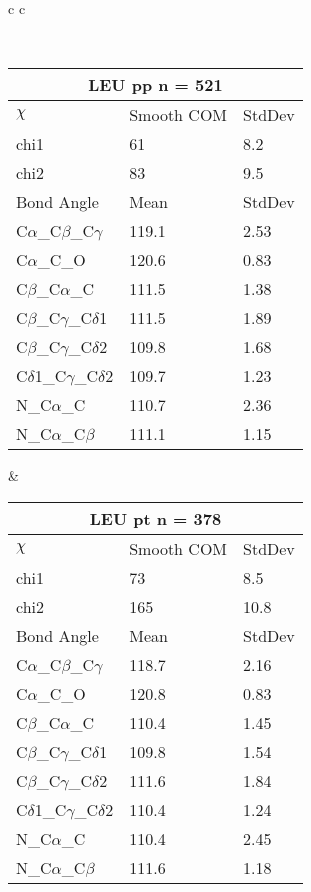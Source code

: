 \newpage

\begin{longtable}{ c c }

\caption{LEU Central Values}\\
  \begin{tabular}{ l l l }
  \toprule
  \multicolumn{3}{c}{LEU \textbf{pp} n = 521} \\ \toprule
  $\chi$       & Smooth COM & StdDev \\ \midrule
  chi1 & 61 & 8.2 \\ 
  chi2 & 83 & 9.5 \\ \midrule
  Bond Angle   & Mean     & StdDev \\ \midrule
  C$\alpha$\_C$\beta$\_C$\gamma$ & 119.1 & 2.53\\
  C$\alpha$\_C\_O & 120.6 & 0.83\\
  C$\beta$\_C$\alpha$\_C & 111.5 & 1.38\\
  C$\beta$\_C$\gamma$\_C$\delta$1 & 111.5 & 1.89\\
  C$\beta$\_C$\gamma$\_C$\delta$2 & 109.8 & 1.68\\
  C$\delta$1\_C$\gamma$\_C$\delta$2 & 109.7 & 1.23\\
  N\_C$\alpha$\_C & 110.7 & 2.36\\
  N\_C$\alpha$\_C$\beta$ & 111.1 & 1.15\\
  \bottomrule
  \end{tabular}
  &
  \begin{tabular}{ l l l }
  \toprule
  \multicolumn{3}{c}{LEU \textbf{pt} n = 378} \\ \toprule
  $\chi$       & Smooth COM & StdDev \\ \midrule
  chi1 & 73 & 8.5 \\ 
  chi2 & 165 & 10.8 \\ \midrule
  Bond Angle   & Mean     & StdDev \\ \midrule
  C$\alpha$\_C$\beta$\_C$\gamma$ & 118.7 & 2.16\\
  C$\alpha$\_C\_O & 120.8 & 0.83\\
  C$\beta$\_C$\alpha$\_C & 110.4 & 1.45\\
  C$\beta$\_C$\gamma$\_C$\delta$1 & 109.8 & 1.54\\
  C$\beta$\_C$\gamma$\_C$\delta$2 & 111.6 & 1.84\\
  C$\delta$1\_C$\gamma$\_C$\delta$2 & 110.4 & 1.24\\
  N\_C$\alpha$\_C & 110.4 & 2.45\\
  N\_C$\alpha$\_C$\beta$ & 111.6 & 1.18\\

\end{tabular}
\end{longtable}
